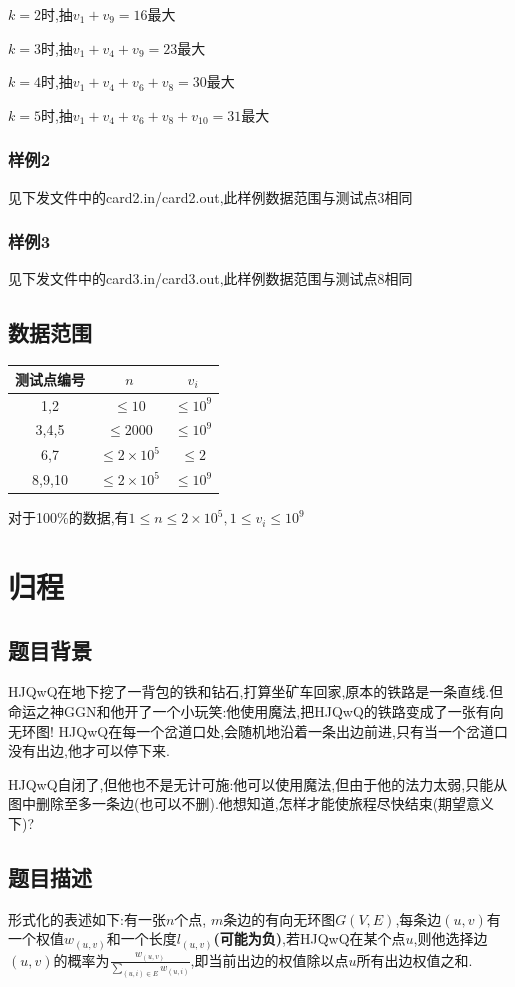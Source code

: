 \documentclass[12pt]{ctexart}
\begin{document}
	$k=2$时,抽$v_1+v_9=16$最大

	$k=3$时,抽$v_1+v_4+v_9=23$最大

	$k=4$时,抽$v_1+v_4+v_6+v_8=30$最大

	$k=5$时,抽$v_1+v_4+v_6+v_8+v_{10}=31$最大
	\subsubsection{样例2}
	见下发文件中的card2.in/card2.out,此样例数据范围与测试点3相同
	\subsubsection{样例3}
	见下发文件中的card3.in/card3.out,此样例数据范围与测试点8相同
	\subsection{数据范围}
	\begin{center}
		\begin{tabular}{|c|c|c|}
			\hline 测试点编号&$n$&$v_i$\\
			\hline 1,2&$\le10$&$\le10^9$\\
			\hline 3,4,5&$\le2000$&$\le10^9$\\
			\hline 6,7&$\le2\times10^5$&$\le2$\\
			\hline 8,9,10&$\le2\times10^5$&$\le10^9$\\
			\hline
		\end{tabular}
	\end{center}
	对于100\%的数据,有$1\le n\le2\times10^5,1\le v_i\le10^9$
	\newpage
	\section{归程}
	\subsection{题目背景}
	HJQwQ在地下挖了一背包的铁和钻石,打算坐矿车回家,原本的铁路是一条直线.但命运之神GGN和他开了一个小玩笑:他使用魔法,把HJQwQ的铁路变成了一张有向无环图! HJQwQ在每一个岔道口处,会随机地沿着一条出边前进,只有当一个岔道口没有出边,他才可以停下来.

	HJQwQ自闭了,但他也不是无计可施:他可以使用魔法,但由于他的法力太弱,只能从图中删除至多一条边(也可以不删).他想知道,怎样才能使旅程尽快结束(期望意义下)?
	\subsection{题目描述}
	形式化的表述如下:有一张$n$个点, $m$条边的有向无环图$G(V,E)$,每条边$(u,v)$有一个权值$w_{(u,v)}$和一个长度$l_{(u,v)}$\textbf{(可能为负)},若HJQwQ在某个点$u$,则他选择边$(u,v)$的概率为$\frac{w_{(u,v)}}{\sum\limits_{(u,i)\in E}w_{(u,i)}}$,即当前出边的权值除以点$u$所有出边权值之和.
\end{document}
